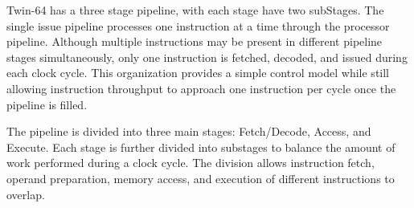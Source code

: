 Twin-64 has a three stage pipeline, with each stage have two subStages. The single issue pipeline processes one instruction at a time through the processor pipeline. Although multiple instructions may be present in different pipeline stages simultaneously, only one instruction is fetched, decoded, and issued during each clock cycle. This organization provides a simple control model while still allowing instruction throughput to approach one instruction per cycle once the pipeline is filled.

The pipeline is divided into three main stages: Fetch/Decode, Access, and Execute. Each stage is further divided into substages to balance the amount of work performed during a clock cycle. The division allows instruction fetch, operand preparation, memory access, and execution of different instructions to overlap.

